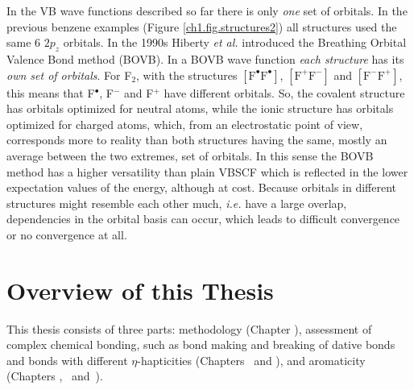 In the VB wave functions described so far there is only \textit{one} set of orbitals. In the previous benzene examples (Figure \ref{ch1.fig.structures2}) all structures used the same 6 $2p_z$ orbitals. In the 1990s Hiberty \textit{et al.} introduced the Breathing Orbital Valence Bond method (BOVB). In a BOVB wave function \textit{each structure} has its \textit{own set of orbitals}. For F$_2$, with the structures $\mathrm{[F^\bullet F^\bullet]}$, $\mathrm{[F^{+} F^{-}]}$ and $\mathrm{[F^{-} F^{+}]}$, this means that F$^\bullet$, F$^{-}$ and F$^{+}$ have different orbitals. So, the covalent structure has orbitals optimized for neutral atoms, while the ionic structure has orbitals optimized for charged atoms, which, from an electrostatic point of view, corresponds more to reality than both structures having the same, mostly an average between the two extremes, set of orbitals. In this sense the BOVB method has a higher versatility than plain VBSCF which is reflected in the lower expectation values of the energy, although at cost. Because orbitals in different structures might resemble each other much, \textit{i.e.} have a large overlap, dependencies in the orbital basis can occur, which leads to difficult convergence or no convergence at all.

\section{Overview of this Thesis}

This thesis consists of three parts: methodology (Chapter \chorbopt), assessment of complex chemical bonding, such as bond making and breaking of dative bonds and bonds with different $\eta$-hapticities (Chapters \chdissociation\ and \chcyclopentadienyl), and aromaticity (Chapters \chhuckel, \chinorganic\ and~\chindacene).

